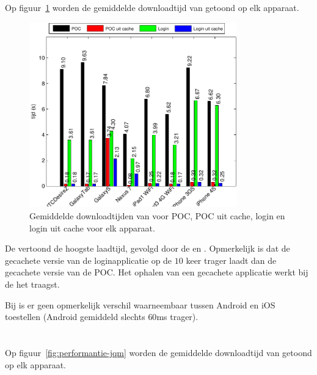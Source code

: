 
\section{\kendo}
\label{sec:app-performantie-kendo}
Op figuur~\ref{fig:performantie-kendo} worden de gemiddelde downloadtijd van \kendo{} getoond op elk apparaat.

\begin{figure}
  \centering
  \includegraphics[width=0.8\textwidth]{figuren/performance-kendo.pdf}
  \caption{Gemiddelde downloadtijden van \kendo{} voor POC,  POC uit cache,  login en login uit cache voor elk apparaat.}
  \label{fig:performantie-kendo}
\end{figure}

De \gtab{} vertoond de hoogste laadtijd,  gevolgd door de \iphoneiii{} en \htc.
Opmerkelijk is dat de gecachete versie van de loginapplicatie op de \nexus{} $10$ keer trager laadt dan de gecachete versie van de POC.
Het ophalen van een gecachete applicatie werkt bij de \gs{} het traagst.

Bij \kendo{} is er geen opmerkelijk verschil waarneembaar tussen Android en iOS toestellen (Android gemiddeld slechts $60$ms trager).


\section{\jqm}
\label{sec:app-performantie-jqm}
Op figuur~\ref{fig:performantie-jqm} worden de gemiddelde downloadtijd van \jqm{} getoond op elk apparaat.

